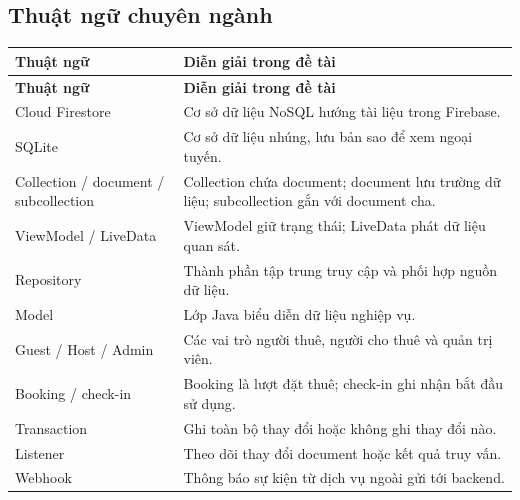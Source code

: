 \documentclass[12pt,a4paper]{article}
\numberwithin{figure}{subsection}
\numberwithin{table}{subsection}
\begin{document}
\subsection*{Thuật ngữ chuyên ngành}
\begin{longtable}{@{}>{\raggedright\arraybackslash}p{4cm}p{10.2cm}@{}}\toprule
\textbf{Thuật ngữ}&\textbf{Diễn giải trong đề tài}\\\midrule\endfirsthead
\toprule\textbf{Thuật ngữ}&\textbf{Diễn giải trong đề tài}\\\midrule\endhead
Cloud Firestore& Cơ sở dữ liệu NoSQL hướng tài liệu trong Firebase.\\
SQLite& Cơ sở dữ liệu nhúng, lưu bản sao để xem ngoại tuyến.\\
Collection / document / subcollection& Collection chứa document; document lưu trường dữ liệu; subcollection gắn với document cha.\\
ViewModel / LiveData& ViewModel giữ trạng thái; LiveData phát dữ liệu quan sát.\\
Repository& Thành phần tập trung truy cập và phối hợp nguồn dữ liệu.\\
Model& Lớp Java biểu diễn dữ liệu nghiệp vụ.\\
Guest / Host / Admin& Các vai trò người thuê, người cho thuê và quản trị viên.\\
Booking / check-in& Booking là lượt đặt thuê; check-in ghi nhận bắt đầu sử dụng.\\
Transaction& Ghi toàn bộ thay đổi hoặc không ghi thay đổi nào.\\
Listener& Theo dõi thay đổi document hoặc kết quả truy vấn.\\
Webhook& Thông báo sự kiện từ dịch vụ ngoài gửi tới backend.\\\bottomrule\end{longtable}
\endgroup
\clearpage
\tableofcontents
\clearpage
{}\pagestyle{fancy}\setcounter{page}{1}







\clearpage
{}
\printbibliography[heading=bibintoc,title={TÀI LIỆU THAM KHẢO}]

\end{document}
